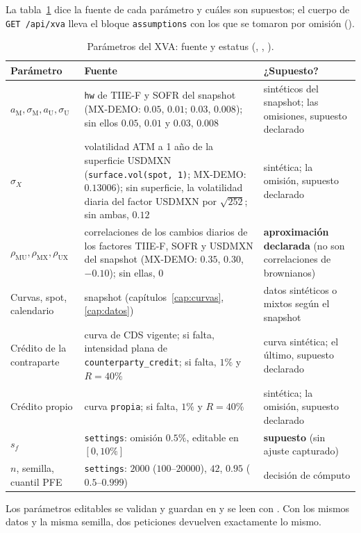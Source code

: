 La tabla~\ref{tab:cap14-parametros} dice la fuente de cada parámetro y cuáles son supuestos; el cuerpo de
\texttt{GET /api/xva} lleva el bloque \texttt{assumptions} con los que se tomaron por omisión
().
\begin{table}[ht]
\centering\small
\begin{tabular}{@{}>{\raggedright\arraybackslash}p{3.6cm}>{\raggedright\arraybackslash}p{6.0cm}>{\raggedright\arraybackslash}p{3.4cm}@{}}
\toprule
Parámetro & Fuente & ¿Supuesto? \\
\midrule
$a_{\mathrm M},\sigma_{\mathrm M},a_{\mathrm U},\sigma_{\mathrm U}$ & \texttt{hw} de TIIE-F y SOFR del snapshot (MX-DEMO: $0.05$, $0.01$; $0.03$, $0.008$); sin ellos $0.05$, $0.01$ y $0.03$, $0.008$ & sintéticos del snapshot; las omisiones, supuesto declarado \\
$\sigma_X$ & volatilidad ATM a 1 año de la superficie USDMXN (\texttt{surface.vol(spot, 1)}; MX-DEMO: $0.13006$); sin superficie, la volatilidad diaria del factor USDMXN por $\sqrt{252}$; sin ambas, $0.12$ & sintética; la omisión, supuesto declarado \\
$\rho_{\mathrm{MU}},\rho_{\mathrm{MX}},\rho_{\mathrm{UX}}$ & correlaciones de los cambios diarios de los factores TIIE-F, SOFR y USDMXN del snapshot (MX-DEMO: $0.35$, $0.30$, $-0.10$); sin ellas, $0$ & \textbf{aproximación declarada} (no son correlaciones de brownianos) \\
Curvas, spot, calendario & snapshot (capítulos~\ref{cap:curvas}, \ref{cap:datos}) & datos sintéticos o mixtos según el snapshot \\
Crédito de la contraparte & curva de CDS vigente; si falta, intensidad plana de \texttt{counterparty\_credit}; si falta, $1\%$ y $R=40\%$ & curva sintética; el último, supuesto declarado \\
Crédito propio & curva \texttt{propia}; si falta, $1\%$ y $R=40\%$ & sintética; la omisión, supuesto declarado \\
$s_f$ & \texttt{settings}: omisión $0.5\%$, editable en $[0,10\%]$ & \textbf{supuesto} (sin ajuste capturado) \\
$n$, semilla, cuantil PFE & \texttt{settings}: $2000$ ($100$--$20000$), $42$, $0.95$ ($0.5$--$0.999$) & decisión de cómputo \\
\bottomrule
\end{tabular}
\caption{Parámetros del XVA: fuente y estatus (,
, ).}\label{tab:cap14-parametros}
\end{table}
Los parámetros editables se validan y guardan en  y se leen con
. Con los mismos datos y la misma semilla, dos peticiones devuelven
exactamente lo mismo.


